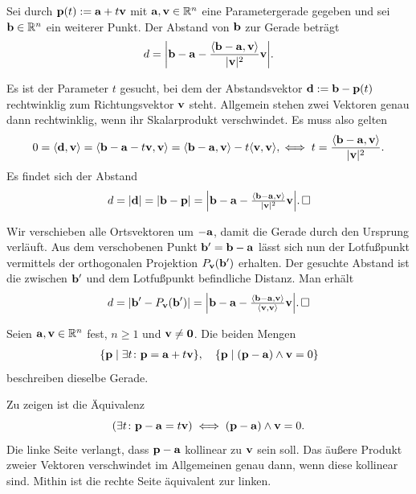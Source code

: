 \begin{Satz}
Sei durch $\mathbf{p}(t):=\mathbf{a}+ t\mathbf{v}$ mit $\mathbf{a}, \mathbf{v}\in\mathbb R^n$ eine
Parametergerade gegeben und sei $\mathbf{b}\in\mathbb R^n$ ein weiterer Punkt.
Der Abstand von $\mathbf{b}$ zur Gerade beträgt
\[d = \bigg|\mathbf{b}-\mathbf{a} - \frac{\langle\mathbf{b}-\mathbf{a},\mathbf{v}\rangle}{|\mathbf{v}|^2}\mathbf{v}\bigg|.\]
\end{Satz}
\begin{Beweis}[Beweis 1]
Es ist der Parameter $t$ gesucht, bei dem der Abstandsvektor
$\mathbf{d} := \mathbf{b}-\mathbf{p}(t)$ rechtwinklig zum Richtungsvektor $\mathbf{v}$ steht.
Allgemein stehen zwei Vektoren genau dann rechtwinklig, wenn ihr
Skalarprodukt verschwindet. Es muss also gelten
\[0 = \langle\mathbf{d},\mathbf{v}\rangle
= \langle\mathbf{b} - \mathbf{a}-t\mathbf{v}, \mathbf{v}\rangle
= \langle\mathbf{b} - \mathbf{a}, \mathbf{v}\rangle - t\langle\mathbf{v},\mathbf{v}\rangle,
\iff t = \frac{\langle\mathbf{b}-\mathbf{a},\mathbf{v}\rangle}{|\mathbf{v}|^2}.\]
Es findet sich der Abstand
\[d = |\mathbf{d}| = |\mathbf{b}-\mathbf{p}|
= \Big|\mathbf{b} - \mathbf{a} - \tfrac{\langle\mathbf{b}-\mathbf{a},\mathbf{v}\rangle}
{|\mathbf{v}|^2}\mathbf{v}\Big|.\,\square\]
\end{Beweis}
\begin{Beweis}[Beweis 2]
Wir verschieben alle Ortsvektoren um $-\mathbf{a}$, damit die Gerade
durch den Ursprung verläuft. Aus dem verschobenen Punkt
$\mathbf{b}' = \mathbf{b}-\mathbf{a}$ lässt sich nun der Lotfußpunkt vermittels der
orthogonalen Projektion $P_{\mathbf{v}}(\mathbf{b}')$ erhalten. Der gesuchte
Abstand ist die zwischen $\mathbf{b}'$ und dem Lotfußpunkt befindliche
Distanz. Man erhält
\[d = |\mathbf{b}' - P_{\mathbf{v}}(\mathbf{b}')|
= \Big|\mathbf{b}-\mathbf{a} - \tfrac{\langle\mathbf{b}-\mathbf{a},\mathbf{v}\rangle}
{\langle\mathbf{v},\mathbf{v}\rangle}\mathbf{v}\Big|.\,\square\]
\end{Beweis}

\begin{Satz}
Seien $\mathbf{a},\mathbf{v}\in\mathbb R^n$ fest, $n\ge 1$ und $\mathbf{v}\ne\mathbf{0}$.
Die beiden Mengen
\begin{gather*}
\{\mathbf{p}\mid \exists t\colon\mathbf{p} = \mathbf{a}+t\mathbf{v}\},\quad
\{\mathbf{p}\mid (\mathbf{p}-\mathbf{a})\wedge\mathbf{v} = 0\}
\end{gather*}
beschreiben dieselbe Gerade.
\end{Satz}
\begin{Beweis}
Zu zeigen ist die Äquivalenz
\[(\exists t\colon\mathbf{p}-\mathbf{a} = t\mathbf{v})\iff (\mathbf{p}-\mathbf{a})\wedge\mathbf{v} = 0.\]
Die linke Seite verlangt, dass $\mathbf{p}-\mathbf{a}$ kollinear zu $\mathbf{v}$ sein
soll. Das äußere Produkt zweier Vektoren verschwindet im Allgemeinen
genau dann, wenn diese kollinear sind. Mithin ist die rechte Seite
äquivalent zur linken.\,\qedsymbol
\end{Beweis}

